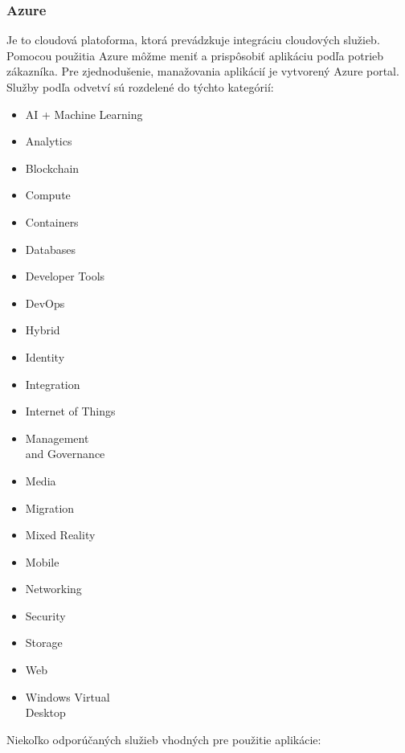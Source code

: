 

\subsubsection{Azure}
Je to cloudová platoforma, ktorá prevádzkuje integráciu cloudových služieb. Pomocou použitia Azure môžme meniť a prispôsobiť aplikáciu podľa potrieb zákazníka. Pre zjednodušenie, manažovania aplikácií je vytvorený Azure portal. Služby podľa odvetví sú rozdelené do týchto kategórií:
\begin{multicols}{3}

    \begin{itemize}
        \item AI + Machine Learning
        \item Analytics
        \item Blockchain
        \item Compute
        \item Containers
        \item Databases
        \item Developer Tools
        \item DevOps
        \item Hybrid
        \item Identity
        \item Integration
        \item Internet of Things
        \item Management \\and Governance
        \item Media
        \item Migration
        \item Mixed Reality
        \item Mobile
        \item Networking
        \item Security
        \item Storage
        \item Web
        \item Windows Virtual\\ Desktop
    
    \end{itemize}
\end{multicols}
Niekoľko odporúčaných služieb vhodných pre použitie aplikácie:
